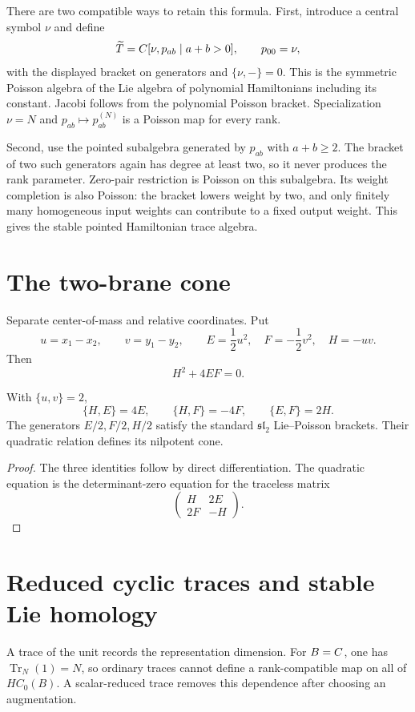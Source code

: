 There are two compatible ways to retain this formula.
First, introduce a central symbol $\nu$ and define
\[
 \widetilde{T}
 =C[\nu,p_{ab}\mid a+b>0],\qquad p_{00}=\nu,
\]
with the displayed bracket on generators and $\{\nu,-\}=0$.
This is the symmetric Poisson algebra of the Lie algebra of polynomial
Hamiltonians including its constant.  Jacobi follows from the
polynomial Poisson bracket.  Specialization $\nu=N$ and
$p_{ab}\mapsto p_{ab}^{(N)}$ is a Poisson map for every rank.

Second, use the pointed subalgebra generated by $p_{ab}$ with
$a+b\ge2$.
The bracket of two such generators again has degree at least two,
so it never produces the rank parameter.  Zero-pair restriction is
Poisson on this subalgebra.  Its weight completion is also Poisson:
the bracket lowers weight by two, and only finitely many homogeneous
input weights can contribute to a fixed output weight.
This gives the stable pointed Hamiltonian trace algebra.

\section{The two-brane cone}
Separate center-of-mass and relative coordinates.  Put
\[
 u=x_1-x_2,
 \qquad
 v=y_1-y_2,
 \qquad
 E=\frac12u^2,
 \quad
 F=-\frac12v^2,
 \quad
 H=-uv.
\]
Then
\[
 H^2+4EF=0.
\]

\begin{proposition}
With $\{u,v\}=2$,
\[
 \{H,E\}=4E,
 \qquad
 \{H,F\}=-4F,
 \qquad
 \{E,F\}=2H.
\]
The generators $E/2,F/2,H/2$ satisfy the standard
$\mathfrak{sl}_2$ Lie--Poisson brackets.  Their quadratic relation
defines its nilpotent cone.
\end{proposition}
\begin{proof}
The three identities follow by direct differentiation.  The quadratic equation is the determinant-zero equation for the traceless matrix
\[
 \begin{pmatrix}H&2E\\2F&-H\end{pmatrix}.
\]
\end{proof}

\section{Reduced cyclic traces and stable Lie homology}
A trace of the unit records the representation dimension.
For $B=C$, one has $\operatorname{Tr}_N(1)=N$, so ordinary traces
cannot define a rank-compatible map on all of $HC_0(B)$.
A scalar-reduced trace removes this dependence after choosing an augmentation.


